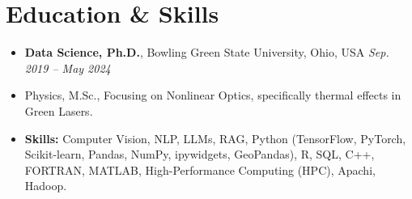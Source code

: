\documentclass[a4paper,10pt]{article}
\begin{document}
\section*{Education \& Skills}

\begin{itemize}
    
    \item {\bfseries Data Science, Ph.D.}, Bowling Green State University, Ohio, USA \hfill \textit{Sep. 2019 -- May 2024}
    
    \item Physics, M.Sc., Focusing on Nonlinear Optics, specifically thermal effects in Green Lasers.
    
    \item {\bfseries Skills:} Computer Vision, NLP, LLMs, RAG, Python (TensorFlow, PyTorch, Scikit-learn, Pandas, NumPy, ipywidgets, GeoPandas), R, SQL, C++, FORTRAN, MATLAB, High-Performance Computing (HPC), Apachi, Hadoop.
    
\end{itemize}
\end{document}
